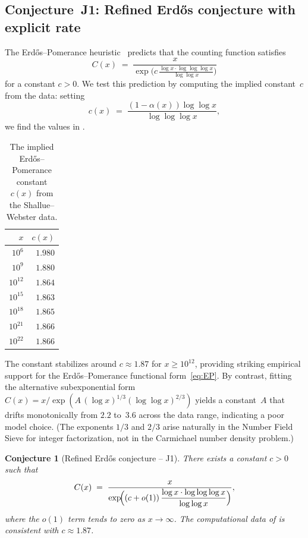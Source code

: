 \documentclass[12pt]{amsart}
\theoremstyle{plain}
\newtheorem{conjecture}[theorem]{Conjecture}
\theoremstyle{definition}
\theoremstyle{remark}
\begin{document}
\subsection{Conjecture~J1: Refined Erd\H{o}s conjecture with
  explicit rate}\label{subsec:J1}

The Erd\H{o}s--Pomerance heuristic~\cite{granvillepomerance2001}
predicts that the counting function satisfies
\begin{equation}\label{eq:EP}
  C(x) \;=\; \frac{x}
  {\exp\!\bigl(c\,\tfrac{\log x\cdot\log\log\log x}
  {\log\log x}\bigr)}
\end{equation}
for a constant $c>0$.  We test this prediction by computing the
implied constant~$c$ from the data: setting
\[
  c(x) \;=\;
  \frac{(1-\alpha(x))\log\log x}{\log\log\log x},
\]
we find the values in .

\begin{table}[ht]
\centering
\caption{The implied Erd\H{o}s--Pomerance constant $c(x)$ from the
  Shallue--Webster data.}
\label{tab:J1}
\begin{tabular}{@{}r@{\qquad}r@{}}
\toprule
$x$ & $c(x)$ \\
\midrule
$10^{6}$  & $1.980$ \\
$10^{9}$  & $1.880$ \\
$10^{12}$ & $1.864$ \\
$10^{15}$ & $1.863$ \\
$10^{18}$ & $1.865$ \\
$10^{21}$ & $1.866$ \\
$10^{22}$ & $1.866$ \\
\bottomrule
\end{tabular}
\end{table}

The constant stabilizes around $c\approx 1.87$ for $x\ge 10^{12}$,
providing striking empirical support for the
Erd\H{o}s--Pomerance functional form~\eqref{eq:EP}.  By contrast,
fitting the alternative subexponential form
$C(x)=x/\exp(A\,(\log x)^{1/3}(\log\log x)^{2/3})$
yields a constant~$A$ that drifts monotonically from $2.2$
to~$3.6$ across the data range, indicating a poor model choice.
(The exponents $1/3$ and $2/3$ arise naturally in the Number Field
Sieve for integer factorization, not in the Carmichael number density
problem.)

\begin{conjecture}[Refined Erd\H{o}s conjecture -- J1]
\label{conj:J1}
There exists a constant $c>0$ such that
\begin{equation}\label{eq:J1}
  C(x) \;=\;
  \frac{x}{\exp\!\Bigl(
    (c+o(1))\,\dfrac{\log x\cdot\log\log\log x}{\log\log x}
  \Bigr)},
\end{equation}
where the $o(1)$ term tends to zero as $x\to\infty$.  The
computational data of  is consistent with
$c\approx 1.87$.
\end{conjecture}
\end{document}
